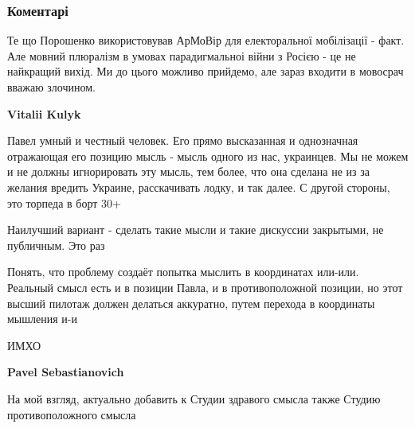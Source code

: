  
 
 
 
 
\subsubsection{Коментарі}

\begin{itemize}

Те що Порошенко використовував АрМоВір для електоральної мобілізації - факт.
Але мовний плюралізм в умовах парадигмальноі війни з Росією - це не найкращий
вихід. Ми до цього можливо прийдемо, але зараз входити в мовосрач вважаю
злочином.

\begin{itemize}
 
\textbf{Vitalii Kulyk} 

Павел умный и честный человек. Его прямо высказанная и однозначная отражающая
его позицию мысль - мысль одного из нас, украинцев. Мы не можем и не должны
игнорировать эту мысль, тем более, что она сделана не из за желания вредить
Украине, расскачивать лодку, и так далее. С другой стороны, это торпеда в борт
30+

Наилучший вариант - сделать такие мысли и такие дискуссии закрытыми, не
публичным. Это раз

Понять, что проблему создаёт попытка мыслить в координатах или-или. Реальный
смысл есть и в позиции Павла, и в противоположной позиции, но этот высший
пилотаж должен делаться аккуратно, путем перехода в координаты мышления и-и

ИМХО


\textbf{Pavel Sebastianovich} 

На мой взгляд, актуально добавить к Студии здравого смысла также Студию
противоположного смысла


\end{itemize}
\end{itemize}
